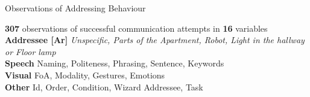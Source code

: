 \begin{frame}{Observations of Addressing Behaviour}
      \begin{footnotesize}
        \textbf{307} observations of successful communication attempts in \textbf{16} variables \vspace{10pt}
      \\\textcolor{mypurple}{\textbf{Addressee [Ar]}} \hspace{2pt} \textit{Unspecific, Parts of the Apartment, Robot, Light in the hallway  or Floor lamp}
      \pause
        \\\textcolor{myorange!50!black}{\textbf{Speech}} \hspace{2pt} Naming, Politeness, Phrasing, Sentence, Keywords
      \pause
        \\\textcolor{myyellow!50!black}{\textbf{Visual}} \hspace{2pt} FoA, Modality, Gestures, Emotions
      \pause
        \\\textcolor{mygray}{\textbf{Other}} \hspace{2pt} Id, Order, Condition, Wizard Addressee, Task
      \end{footnotesize}
\end{frame}
